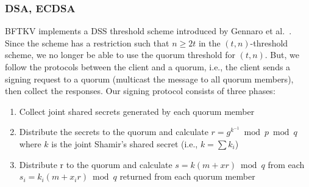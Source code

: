 \subsubsection*{DSA, ECDSA}
BFTKV implements a DSS threshold scheme introduced by Gennaro et
al.\ \cite{Gennaro}.
Since the scheme has a restriction such that $n \geq 2t$ in the $(t,
n)$-threshold scheme, we no longer be able to use the quorum threshold
for $(t, n)$. But, we follow the protocols between the client and a
quorum, i.e., the client sends a signing request to a quorum
(multicast the message to all quorum members), then collect the
responses. Our signing protocol consists of three phases:
\begin{enumerate}
\item Collect joint shared secrets generated by each quorum member
\item Distribute the secrets to the quorum and calculate
  $r=g^{k^{-1}} \bmod p \bmod q$ where $k$ is the
  joint Shamir's shared secret (i.e., $k = \sum k_i$)
\item Distribute r to the quorum and calculate $s=k(m+xr) \bmod q$
  from each $s_i=k_i(m+x_ir) \bmod q$ returned from each quorum member
\end{enumerate}

